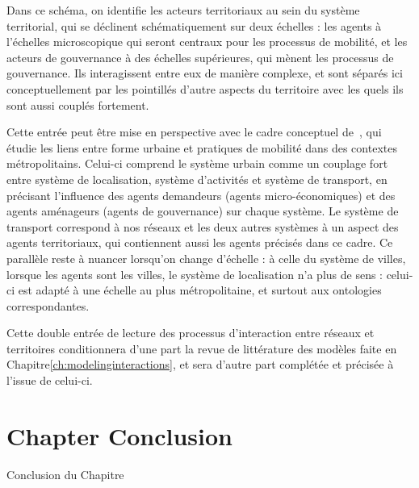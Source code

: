 Dans ce schéma, on identifie les acteurs territoriaux au sein du système territorial, qui se déclinent schématiquement sur deux échelles : les agents à l'échelles microscopique qui seront centraux pour les processus de mobilité, et les acteurs de gouvernance à des échelles supérieures, qui mènent les processus de gouvernance. Ils interagissent entre eux de manière complexe, et sont séparés ici conceptuellement par les pointillés d'autre aspects du territoire avec les quels ils sont aussi couplés fortement.


Cette entrée peut être mise en perspective avec le cadre conceptuel de~\cite{le2010approche}, qui étudie les liens entre forme urbaine et pratiques de mobilité dans des contextes métropolitains. Celui-ci comprend le système urbain comme un couplage fort entre système de localisation, système d'activités et système de transport, en précisant l'influence des agents demandeurs (agents micro-économiques) et des agents aménageurs (agents de gouvernance) sur chaque système. Le système de transport correspond à nos réseaux et les deux autres systèmes à un aspect des agents territoriaux, qui contiennent aussi les agents précisés dans ce cadre. Ce parallèle reste à nuancer lorsqu'on change d'échelle : à celle du système de villes, lorsque les agents sont les villes, le système de localisation n'a plus de sens : celui-ci est adapté à une échelle au plus métropolitaine, et surtout aux ontologies correspondantes.


\bigskip

Cette double entrée de lecture des processus d'interaction entre réseaux et territoires conditionnera d'une part la revue de littérature des modèles faite en Chapitre\ref{ch:modelinginteractions}, et sera d'autre part complétée et précisée à l'issue de celui-ci.





\newpage


\section*{Chapter Conclusion}{Conclusion du Chapitre}



